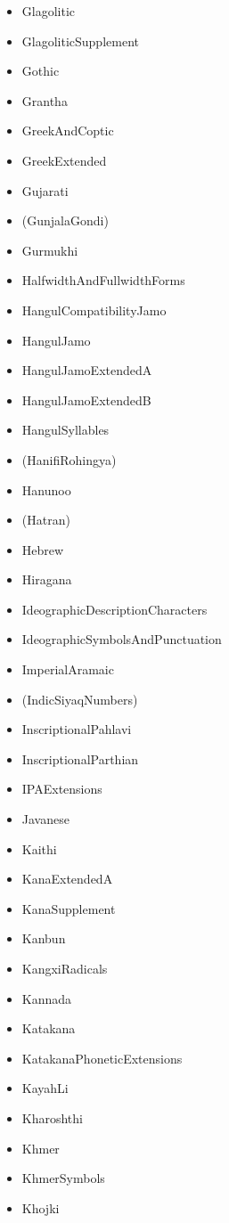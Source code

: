 \documentclass{article}
\newenvironment{itemlist}{%
  \begin{itemize}
	\setlength{\itemsep}{0pt}
	\setlength{\parsep}{0pt}
	\setlength{\topsep}{0pt}
	\setlength{\partopsep}{0pt}
	\setlength{\parskip}{0pt}
	\setlength{\labelsep}{5pt}}%
{
  \end{itemize}}
\begin{document}
\begin{multicols*}{2}
\begin{itemlist}
				\item Glagolitic
				\item GlagoliticSupplement
				\item Gothic
				\item Grantha
				\item GreekAndCoptic
				\item GreekExtended
				\item Gujarati
				\item (GunjalaGondi)
				\item Gurmukhi
				\item HalfwidthAndFullwidthForms
				\item HangulCompatibilityJamo
				\item HangulJamo
				\item HangulJamoExtendedA
				\item HangulJamoExtendedB
				\item HangulSyllables
				\item (HanifiRohingya)
				\item Hanunoo
				\item (Hatran)
				\item Hebrew
				\item Hiragana
				\item IdeographicDescriptionCharacters
				\item IdeographicSymbolsAndPunctuation
				\item ImperialAramaic
				\item (IndicSiyaqNumbers)
				\item InscriptionalPahlavi
				\item InscriptionalParthian
				\item IPAExtensions
				\item Javanese
				\item Kaithi
				\item KanaExtendedA
				\item KanaSupplement
				\item Kanbun
				\item KangxiRadicals
				\item Kannada
				\item Katakana
				\item KatakanaPhoneticExtensions
				\item KayahLi
				\item Kharoshthi
				\item Khmer
				\item KhmerSymbols
				\item Khojki

\end{itemlist}
\end{multicols*}
\end{document}
